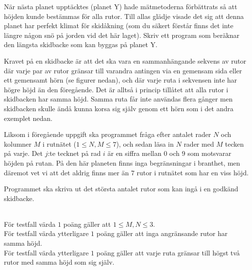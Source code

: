 När nästa planet upptäcktes (planet Y) hade mätmetoderna förbättrats så att höjden kunde bestämmas för alla rutor. Till allas glädje visade det sig att denna planet har perfekt klimat för skidåkning (som du säkert förstår finns det inte längre någon snö på jorden vid det här laget). Skriv ett program som beräknar den längsta skidbacke som kan byggas på planet Y.

Kravet på en skidbacke är att det ska vara en sammanhängande sekvens av rutor där varje par av rutor gränsar till varandra antingen via en gemensam sida eller ett gemensamt hörn (se figurer nedan), och där varje ruta i sekvensen inte har högre höjd än den föregående. Det är alltså i princip tillåtet att alla rutor i skidbacken har samma höjd. Samma ruta får inte användas flera gånger men skidbacken skulle ändå kunna korsa sig själv genom ett hörn som i det andra exemplet nedan.

Liksom i föregående uppgift ska programmet fråga efter antalet rader $N$ och kolumner $M$ i rutnätet ($1\leq N,M \leq 7$), och 
sedan läsa in $N$ rader med $M$ tecken på varje.
Det $j$:te tecknet på rad $i$ är en siffra mellan
0 och 9 som motsvarar höjden på rutan. På den här planeten finns inga begränsningar i branthet, men däremot vet vi att det aldrig finns mer än $7$ rutor i rutnätet som har en viss höjd.

Programmet ska skriva ut det största antalet rutor som kan ingå i en godkänd skidbacke.

\\
För testfall värda $1$ poäng gäller att $1\leq M,N \leq 3$. \\
För testfall värda ytterligare $1$ poäng gäller att inga angränsande rutor har samma höjd. \\
För testfall värda ytterligare $1$ poäng gäller att varje ruta gränsar till högst två rutor med samma höjd som sig själv.\\



